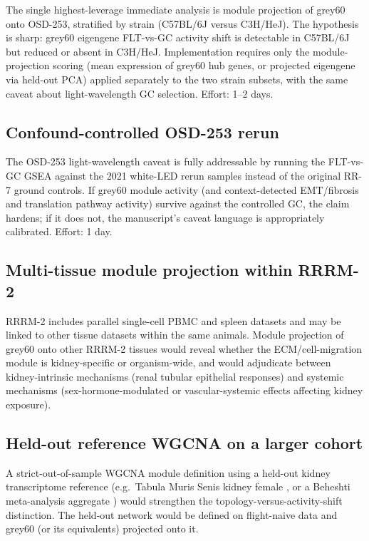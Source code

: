 \documentclass[11pt]{article}
\begin{document}
The single highest-leverage immediate analysis is module projection of grey60 onto OSD-253, stratified by strain (C57BL/6J versus C3H/HeJ). The hypothesis is sharp: grey60 eigengene FLT-vs-GC activity shift is detectable in C57BL/6J but reduced or absent in C3H/HeJ. Implementation requires only the module-projection scoring (mean expression of grey60 hub genes, or projected eigengene via held-out PCA) applied separately to the two strain subsets, with the same caveat about light-wavelength GC selection. Effort: 1--2 days.

\subsection{Confound-controlled OSD-253 rerun}

The OSD-253 light-wavelength caveat is fully addressable by running the FLT-vs-GC GSEA against the 2021 white-LED rerun samples instead of the original RR-7 ground controls. If grey60 module activity (and context-detected EMT/fibrosis and translation pathway activity) survive against the controlled GC, the claim hardens; if it does not, the manuscript's caveat language is appropriately calibrated. Effort: 1 day.

\subsection{Multi-tissue module projection within RRRM-2}

RRRM-2 includes parallel single-cell PBMC and spleen datasets and may be linked to other tissue datasets within the same animals. Module projection of grey60 onto other RRRM-2 tissues would reveal whether the ECM/cell-migration module is kidney-specific or organism-wide, and would adjudicate between kidney-intrinsic mechanisms (renal tubular epithelial responses) and systemic mechanisms (sex-hormone-modulated or vascular-systemic effects affecting kidney exposure).

\subsection{Held-out reference WGCNA on a larger cohort}

A strict-out-of-sample WGCNA module definition using a held-out kidney transcriptome reference (e.g.\ Tabula Muris Senis kidney female \citep{tabula2020}, or a Beheshti meta-analysis aggregate \citep{beheshti2018microrna}) would strengthen the topology-versus-activity-shift distinction. The held-out network would be defined on flight-naive data and grey60 (or its equivalents) projected onto it.
\end{document}
